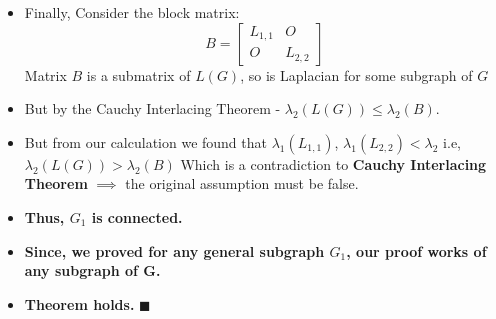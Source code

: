 \documentclass[aspectratio=169]{beamer}
\begin{document}
\begin{frame}
    
\begin{itemize}
     \item Finally, Consider the block matrix:
    \[ B =
    \begin{bmatrix}
        L_{1,1} & O \\
        O & L_{2,2}
    \end{bmatrix}
    \]
     Matrix \(B\) is a submatrix of \( L(G) \), so is Laplacian for some subgraph of \(G\) 
    
    \item But by the Cauchy Interlacing Theorem - \( \lambda_2(L(G)) \le \lambda_2(B)\).

    \item But from our calculation we found that \( \lambda_1(L_{1,1}) \),  \( \lambda_1(L_{2,2}) < \lambda_2 \) i.e, \( \lambda_2(L(G)) > \lambda_2(B)\) Which is a contradiction to \textbf{ Cauchy Interlacing Theorem}  
    \( \implies\) the original assumption must be false.
    \item \textbf{Thus, \(G_1\) is connected.}
    \item \textbf{Since, we proved for any general subgraph \(G_1\), our proof works of any subgraph of G.}
    \item \textbf{Theorem holds.} \hfill \(\blacksquare\)
\end{itemize}
\end{frame}
\end{document}

